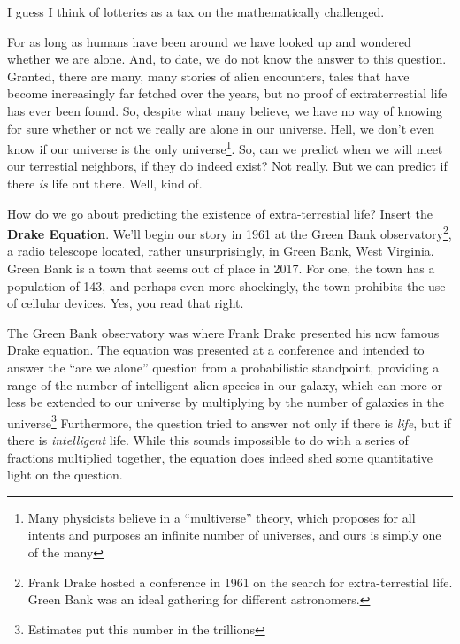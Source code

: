 \documentclass[../../fulltext/fulltext.tex]{subfiles}
\begin{document}
\begin{savequote}[45mm]
I guess I think of lotteries as a tax on the mathematically challenged.
\end{savequote}

For as long as humans have been around we have looked up and wondered whether we are alone. 
And, to date, we do not know the answer to this question.  Granted, there are many, many stories of alien encounters, tales that have become increasingly far fetched over the years, but no proof of extraterrestial life has ever been found. So, despite what many believe, we have no way of knowing for sure whether or not we really are alone in our universe.  Hell, we don't even know if our universe is the only universe\footnote{Many physicists believe in a \enquote{multiverse} theory, which proposes for all intents and purposes an infinite number of universes, and ours is simply one of the many}. So, can we predict when we will meet our terrestial neighbors, if they do indeed exist?  Not really.  But we can predict if there \emph{is} life out there.  Well, kind of.  

How do we go about predicting the existence of extra-terrestial life?  Insert the \textbf{Drake Equation}. We'll begin our story in 1961 at the Green Bank observatory\footnote{ Frank Drake hosted a conference in 1961 on the search for extra-terrestial life.  Green Bank was an ideal gathering for different astronomers.}, a radio telescope located, rather unsurprisingly, in Green Bank, West Virginia.\cite{GreenBank} Green Bank is a town that seems out of place in 2017. For one, the town has a population of 143, and perhaps even more shockingly, the town prohibits the use of cellular devices.  Yes, you read that right.  

The Green Bank observatory was where Frank Drake presented his now famous Drake equation.  The equation was presented at a conference and intended to answer the ``are we alone'' question from a probabilistic standpoint, providing a range of the number of intelligent alien species in our galaxy, which can more or less be extended to our universe by multiplying by the number of galaxies in the universe\cite{numgalax}\footnote{Estimates put this number in the trillions} Furthermore, the question tried to answer not only if there is \emph{life}, but if there is \emph{intelligent} life.  While this sounds impossible to do with a series of fractions multiplied together, the equation does indeed shed some quantitative light on the question.
\end{document}
